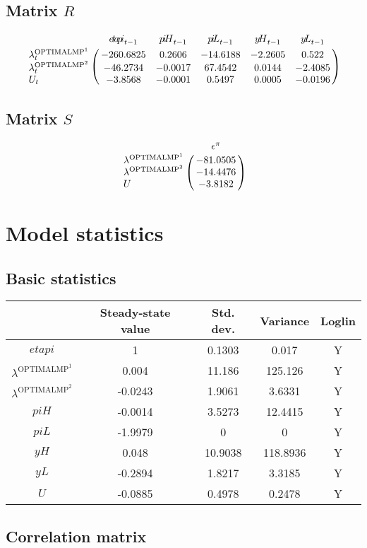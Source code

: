 \subsection*{Matrix $R$}

$$\bordermatrix{
~ & {e\!t\!a\!p\!i}_{t-1} & {p\!i\!H}_{t-1} & {p\!i\!L}_{t-1} & {y\!H}_{t-1} & {y\!L}_{t-1} \cr
\lambda^{\mathrm{OPTIMALMP}^{\mathrm{1}}}_{t} & -260.6825 & 0.2606 & -14.6188 & -2.2605 & 0.522 \cr
\lambda^{\mathrm{OPTIMALMP}^{\mathrm{2}}}_{t} & -46.2734 & -0.0017 & 67.4542 & 0.0144 & -2.4085 \cr
U_{t} & -3.8568 & -0.0001 & 0.5497 & 0.0005 & -0.0196 \cr
}$$

\subsection*{Matrix $S$}

$$\bordermatrix{
~ & \epsilon^{\pi} \cr
\lambda^{\mathrm{OPTIMALMP}^{\mathrm{1}}} & -81.0505 \cr
\lambda^{\mathrm{OPTIMALMP}^{\mathrm{2}}} & -14.4476 \cr
U & -3.8182 \cr
}$$


\section{Model statistics}

\subsection{Basic statistics}

\begin{tabular}{c|c|c|c|c|}
  & Steady-state value & Std. dev. & Variance & Loglin\\
\hline
${e\!t\!a\!p\!i}$ & 1 & 0.1303 & 0.017 & Y    \\
$\lambda^{\mathrm{OPTIMALMP}^{\mathrm{1}}}$ & 0.004 & 11.186 & 125.126 & Y    \\
$\lambda^{\mathrm{OPTIMALMP}^{\mathrm{2}}}$ & -0.0243 & 1.9061 & 3.6331 & Y    \\
${p\!i\!H}$ & -0.0014 & 3.5273 & 12.4415 & Y    \\
${p\!i\!L}$ & -1.9979 & 0 & 0 & Y    \\
${y\!H}$ & 0.048 & 10.9038 & 118.8936 & Y    \\
${y\!L}$ & -0.2894 & 1.8217 & 3.3185 & Y    \\
$U$ & -0.0885 & 0.4978 & 0.2478 & Y    \\
\hline
\end{tabular}


\subsection{Correlation matrix}

